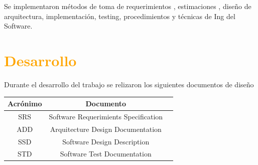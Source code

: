 \documentclass[a4paper,11pt]{book}
\begin{document}
Se implementaron métodos de toma de requerimientos , estimaciones ,
diseño de arquitectura, implementación, testing, procedimientos y técnicas
de Ing del Software.

\section{\textcolor{orange}{Desarrollo}}
Durante el desarrollo del trabajo se relizaron los siguientes documentos de
diseño

\vspace{1cm}

\begin{table}[!h]
\begin{center}
\begin{tabular}{|c|c|c|}
\hline
\rowcolor[RGB]{255,127,0} Acrónimo & Documento \\
\hline
SRS & Software Requerimients Specification \\
\hline
ADD & Arquitecture Design Documentation \\
\hline
SSD & Software Design Description \\
\hline
STD & Software Test Documentation \\
\hline
\end{tabular}
\end{center}
\end{table}





\end{document}
